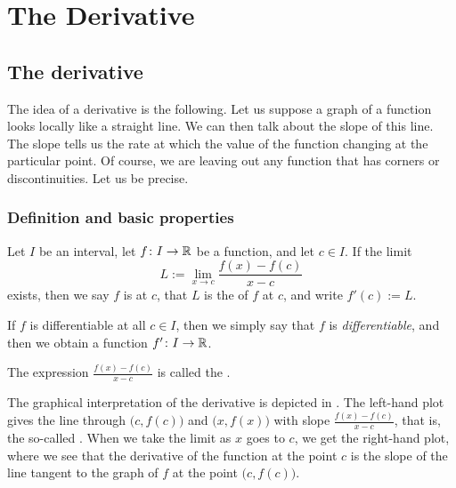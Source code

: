 \chapter{The Derivative} \label{der:chapter}


\section{The derivative}
\label{sec:der}


The idea of a derivative is the following.
Let us suppose a graph of a function looks locally like a straight line.
We can then talk about the slope of this line.  The slope tells us 
the rate at which 
the value of the function changing at the particular point.
Of course, we are leaving out any function that has corners or
discontinuities.  Let us be precise.

\subsection{Definition and basic properties}

\begin{defn}
Let $I$ be an interval, let
$f \colon I \to {\mathbb{R}}$ be a function, and let $c \in I$.  If 
the limit
\begin{equation*}
L := \lim_{x \to c} \frac{f(x)-f(c)}{x-c} 
\end{equation*}
exists, then we say $f$ is \emph{} at
$c$, that $L$ is the \emph{} of $f$ at $c$,
and write $f'(c) := L$.

\medskip

If $f$ is differentiable at all $c \in I$, then we simply say that
$f$ is \emph{differentiable}, and then we obtain a function
$f' \colon I \to {\mathbb{R}}$.

\medskip

The expression $\frac{f(x)-f(c)}{x-c}$ is called the
\emph{}.
\end{defn}

The graphical interpretation of the derivative is  depicted in
.  The left-hand plot gives the line through
$\bigl(c,f(c)\bigr)$
and $\bigl(x,f(x)\bigr)$ with slope
$\frac{f(x)-f(c)}{x-c}$, that is,
the so-called \emph{}.  When we take the limit as $x$ goes to $c$,
we get the right-hand plot, where we see
that the derivative of the function
at the point $c$ is the slope of the line tangent to the graph of $f$
at the point $\bigl(c,f(c)\bigr)$.

